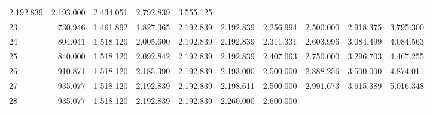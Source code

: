 \begin{tabular}{llllllllll}
  \multicolumn{1}{r}{2.192.839} &
  \multicolumn{1}{r}{2.193.000} &
  \multicolumn{1}{r}{2.434.051} &
  \multicolumn{1}{r}{2.792.839} &
  \multicolumn{1}{r}{3.555.125} \\
\multicolumn{1}{l}{\hspace{1em}23} &
  \multicolumn{1}{|r}{730.946} &
  \multicolumn{1}{r}{1.461.892} &
  \multicolumn{1}{r}{1.827.365} &
  \multicolumn{1}{r}{2.192.839} &
  \multicolumn{1}{r}{2.192.839} &
  \multicolumn{1}{r}{2.256.994} &
  \multicolumn{1}{r}{2.500.000} &
  \multicolumn{1}{r}{2.918.375} &
  \multicolumn{1}{r}{3.795.300} \\
\multicolumn{1}{l}{\hspace{1em}24} &
  \multicolumn{1}{|r}{804.041} &
  \multicolumn{1}{r}{1.518.120} &
  \multicolumn{1}{r}{2.005.600} &
  \multicolumn{1}{r}{2.192.839} &
  \multicolumn{1}{r}{2.192.839} &
  \multicolumn{1}{r}{2.311.331} &
  \multicolumn{1}{r}{2.603.996} &
  \multicolumn{1}{r}{3.084.499} &
  \multicolumn{1}{r}{4.084.563} \\
\multicolumn{1}{l}{\hspace{1em}25} &
  \multicolumn{1}{|r}{840.000} &
  \multicolumn{1}{r}{1.518.120} &
  \multicolumn{1}{r}{2.092.842} &
  \multicolumn{1}{r}{2.192.839} &
  \multicolumn{1}{r}{2.192.839} &
  \multicolumn{1}{r}{2.407.063} &
  \multicolumn{1}{r}{2.750.000} &
  \multicolumn{1}{r}{3.296.703} &
  \multicolumn{1}{r}{4.467.255} \\
\multicolumn{1}{l}{\hspace{1em}26} &
  \multicolumn{1}{|r}{910.871} &
  \multicolumn{1}{r}{1.518.120} &
  \multicolumn{1}{r}{2.185.390} &
  \multicolumn{1}{r}{2.192.839} &
  \multicolumn{1}{r}{2.193.000} &
  \multicolumn{1}{r}{2.500.000} &
  \multicolumn{1}{r}{2.888.256} &
  \multicolumn{1}{r}{3.500.000} &
  \multicolumn{1}{r}{4.874.011} \\
\multicolumn{1}{l}{\hspace{1em}27} &
  \multicolumn{1}{|r}{935.077} &
  \multicolumn{1}{r}{1.518.120} &
  \multicolumn{1}{r}{2.192.839} &
  \multicolumn{1}{r}{2.192.839} &
  \multicolumn{1}{r}{2.198.611} &
  \multicolumn{1}{r}{2.500.000} &
  \multicolumn{1}{r}{2.991.673} &
  \multicolumn{1}{r}{3.615.389} &
  \multicolumn{1}{r}{5.016.348} \\
\multicolumn{1}{l}{\hspace{1em}28} &
  \multicolumn{1}{|r}{935.077} &
  \multicolumn{1}{r}{1.518.120} &
  \multicolumn{1}{r}{2.192.839} &
  \multicolumn{1}{r}{2.192.839} &
  \multicolumn{1}{r}{2.260.000} &
  \multicolumn{1}{r}{2.600.000} &

\end{tabular}
